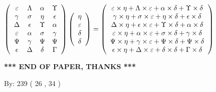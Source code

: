 \documentclass[12pt]{article}
\begin{document}
$  %
 \left( \begin{array}
 {
 c
 c
 c
 c
 }
 \varepsilon & 
 \Lambda & 
 \alpha & 
 \Upsilon \\ 
 \gamma & 
 \sigma & 
 \eta & 
 \epsilon \\ 
 \Delta & 
 \epsilon & 
 \Upsilon & 
 \alpha \\ 
 \varepsilon & 
 \alpha & 
 \sigma & 
 \gamma \\ 
 \Psi & 
 \gamma & 
 \Psi & 
 \Psi \\ 
 \epsilon & 
 \Delta & 
 \delta & 
 \Gamma
 \end{array} \right)
 \left( \begin{array}
 {
 c
 }
 \eta \\ 
 \varepsilon \\ 
 \delta \\ 
 \delta
 \end{array} \right)
=
 \left( \begin{array}
 {
 c
 }
  \varepsilon \times  \eta +  \Lambda \times  \varepsilon +  \alpha \times  \delta +  \Upsilon \times  \delta \\ 
  \gamma \times  \eta +  \sigma \times  \varepsilon +  \eta \times  \delta +  \epsilon \times  \delta \\ 
  \Delta \times  \eta +  \epsilon \times  \varepsilon +  \Upsilon \times  \delta +  \alpha \times  \delta \\ 
  \varepsilon \times  \eta +  \alpha \times  \varepsilon +  \sigma \times  \delta +  \gamma \times  \delta \\ 
  \Psi \times  \eta +  \gamma \times  \varepsilon +  \Psi \times  \delta +  \Psi \times  \delta \\ 
  \epsilon \times  \eta +  \Delta \times  \varepsilon +  \delta \times  \delta +  \Gamma \times  \delta
 \end{array} \right)
$
 
 
 
   
   
 \vspace{0.2in}
 
   
   
   
   
\vspace{1.0in} 
{\textbf{\large{ *** END OF PAPER, THANKS *** }}} 
   
   
\hspace{1.0in} By: 
         239 (          26 ,           34 )
   
   
   
   
\newpage 
\setcounter{page}{ 
    27001 } 
   
\end{document}
